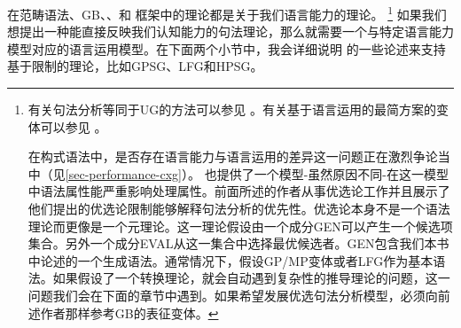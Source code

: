 在范畴语法、GB\indexgbc、\lfgc、\gpsgc 和 \hpsgc 框架中的理论都是关于我们语言能力的理论。 \footnote{%
有关句法分析等同于UG的方法可以参见 。有关基于语言运用的最简方案的变体可以参见 。

在构式语法\indexcxgc 中，是否存在语言能力与语言运用的差异这一问题正在激烈争论当中（见\ref{sec-performance-cxg}）。 \citet*{FSCK99a}也提供了一个模型-虽然原因不同-在这一模型中语法属性能严重影响处理属性。前面所述的作者从事优选论工作并且展示了他们提出的优选论限制能够解释句法分析的优先性。优选论\indexotc 本身不是一个语法理论而更像是一个元理论。这一理论假设由一个成分GEN可以产生一个候选项集合。另外一个成分EVAL从这一集合中选择最优候选者。GEN包含我们本书中论述的一个生成语法。通常情况下，假设GP/MP变体\indexgbc  或者LFG\indexlfgc 作为基本语法。如果假设了一个转换理论，就会自动遇到复杂性的推导理论的问题，这一问题我们会在下面的章节中遇到。如果希望发展优选句法分析模型，必须向前述作者那样参考GB的表征变体。
}
如果我们想提出一种能直接反映我们认知能力的句法理论，那么就需要一个与特定语言能力模型对应的语言运用模型。在下面两个小节中，我会详细说明 \citet{SW2011a}的一些论述来支持基于限制的理论，比如GPSG、LFG和HPSG。



